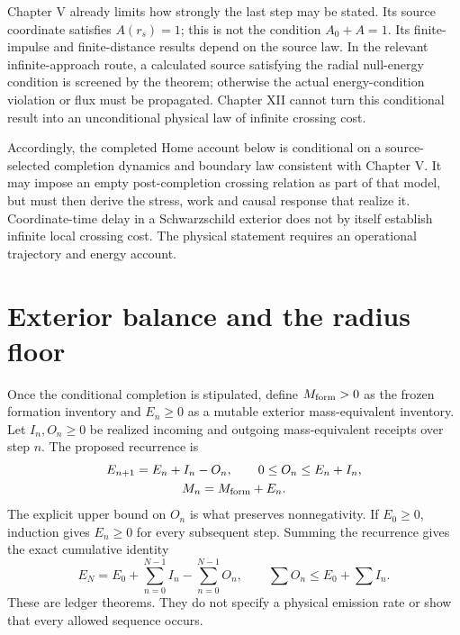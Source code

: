 Chapter V already limits how strongly the last step may be stated. Its source coordinate satisfies $A(r_s)=1$; this is not the condition $A_0+A=1$. Its finite-impulse and finite-distance results depend on the source law. In the relevant infinite-approach route, a calculated source satisfying the radial null-energy condition is screened by the theorem; otherwise the actual energy-condition violation or flux must be propagated. Chapter XII cannot turn this conditional result into an unconditional physical law of infinite crossing cost.

Accordingly, the completed Home account below is conditional on a source-selected completion dynamics and boundary law consistent with Chapter V. It may impose an empty post-completion crossing relation as part of that model, but must then derive the stress, work and causal response that realize it. Coordinate-time delay in a Schwarzschild exterior does not by itself establish infinite local crossing cost. The physical statement requires an operational trajectory and energy account.

\section{Exterior balance and the radius floor}
Once the conditional completion is stipulated, define $M_{\rm form}>0$ as the frozen formation inventory and $E_n\geq0$ as a mutable exterior mass-equivalent inventory. Let $I_n,O_n\geq0$ be realized incoming and outgoing mass-equivalent receipts over step $n$. The proposed recurrence is
\begin{equation}
 \begin{gathered}
 E_{n+1}=E_n+I_n-O_n,\qquad 0\leq O_n\leq E_n+I_n,\\
 M_n=M_{\rm form}+E_n.
 \end{gathered}
 \label{c12:recurrence}
\end{equation}
The explicit upper bound on $O_n$ is what preserves nonnegativity. If $E_0\geq0$, induction gives $E_n\geq0$ for every subsequent step. Summing the recurrence gives the exact cumulative identity
\begin{equation}
 E_N=E_0+\sum_{n=0}^{N-1}I_n-\sum_{n=0}^{N-1}O_n,
 \qquad
 \sum O_n\leq E_0+\sum I_n.
 \label{c12:cumulative}
\end{equation}
These are ledger theorems. They do not specify a physical emission rate or show that every allowed sequence occurs.

